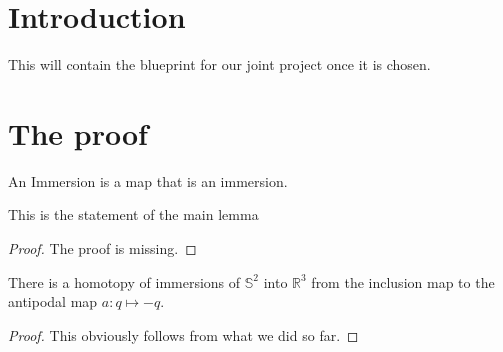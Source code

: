 
\chapter*{Introduction}

This will contain the blueprint for our joint project once it is chosen.

\chapter{The proof}

\begin{definition}[Immersion]
  \label{def:immersion}
  \leanok
  An Immersion is a map that is an immersion.
\end{definition}

\begin{lemma}
  \label{lem:main}
  \leanok
  This is the statement of the main lemma
\end{lemma}

\begin{proof}
  The proof is missing.
\end{proof}

\begin{theorem}[Smale 1958]
  \label{thm:sphere_eversion}
  \leanok
  There is a homotopy of immersions of $𝕊^2$ into $ℝ^3$ from the inclusion map to
  the antipodal map $a : q ↦ -q$.
\end{theorem}

\begin{proof}
  \leanok
  This obviously follows from what we did so far.
\end{proof}